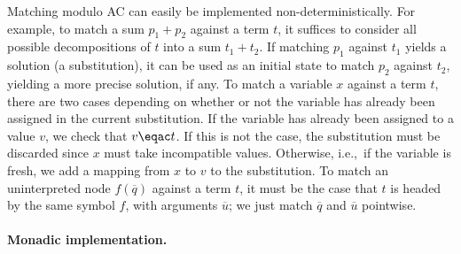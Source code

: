 \documentclass{llncs}
\begin{document}
Matching modulo AC can easily be implemented non-determi\-nistically.
For example, to match a sum $p_1+p_2$ against a term $t$, it suffices
to consider all possible decompositions of $t$ into a sum $t_1 +
t_2$. If matching $p_1$ against $t_1$ yields a solution (a
substitution), it can be used as an initial state to match $p_2$
against $t_2$, yielding a more precise solution, if any.
To match a variable $x$ against a term $t$, there are two cases
depending on whether or not the variable has already been assigned in
the current substitution.  If the variable has already been assigned
to a value $v$, we check that $v \eqac t$. If this is not the case,
the substitution must be discarded since $x$ must take incompatible
values. Otherwise, i.e.,\ if the variable is fresh, we add a mapping
from $x$ to $v$ to the substitution.
To match an uninterpreted node $f(\overline{q})$ against a term $t$,
it must be the case that $t$ is headed by the same symbol $f$, with
arguments $\overline{u}$; we just match $\overline{q}$ and
$\overline{u}$ pointwise.

\paragraph{Monadic implementation.}
\end{document}
